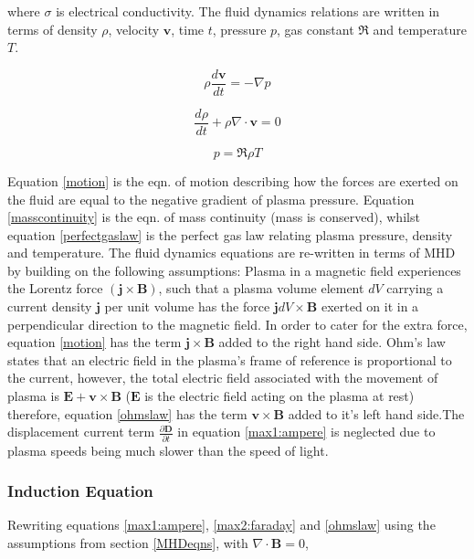 \documentclass[11pt]{article}
\renewcommand{\vec}[1]{\mathbf{#1}}
\begin{document}
where $\sigma$ is electrical conductivity. The fluid dynamics relations are written in terms of density $\rho$, velocity $\vec{v}$, time $t$, pressure $p$, gas constant $\Re$ and temperature $T$. 

\begin{equation}\label{motion}
\rho\frac{d\vec{v}}{dt}=-\nabla p
\end{equation}
 
\begin{equation}\label{masscontinuity}
\frac{d\rho}{dt}+\rho\nabla\cdot\vec{v}=0
\end{equation}

\begin{equation}\label{perfectgaslaw}
p=\Re\rho T
\end{equation}

Equation \ref{motion} is the eqn. of motion describing how the forces are exerted on the fluid are equal to the negative gradient of plasma pressure. Equation \ref{masscontinuity} is the eqn. of mass continuity (mass is conserved), whilst equation \ref{perfectgaslaw} is the perfect gas law relating plasma pressure, density and temperature. The fluid dynamics equations are re-written in terms of MHD by building on the following assumptions: Plasma in a magnetic field experiences the Lorentz force $(\vec{j}\times\vec{B})$, such that a plasma volume element $dV$ carrying a current density $\vec{j}$ per unit volume has the force $\vec{j}dV\times\vec{B}$ exerted on it in a perpendicular direction to the magnetic field. In order to cater for the extra force, equation \ref{motion} has the term $\vec{j}\times\vec{B}$ added to the right hand side.   
Ohm's law states that an electric field in the plasma's frame of reference is proportional to the current, however, the total electric field associated with the movement of plasma is $\vec{E}+\vec{v}\times\vec{B}$ ($\vec{E}$ is the electric field acting on the plasma at rest) therefore, equation \ref{ohmslaw} has the term $\vec{v}\times\vec{B}$ added to it's left hand side.The displacement current term $\frac{\partial \vec{D}}{\partial t}$ in equation \ref{max1:ampere} is neglected due to plasma speeds being much slower than the speed of light.

\subsubsection{Induction Equation}\label{inductioneqn}  
Rewriting equations \ref{max1:ampere}, \ref{max2:faraday} and \ref{ohmslaw} using the assumptions from section \ref{MHDeqns}, with $\nabla\cdot\vec{B} = 0$,
\end{document}
